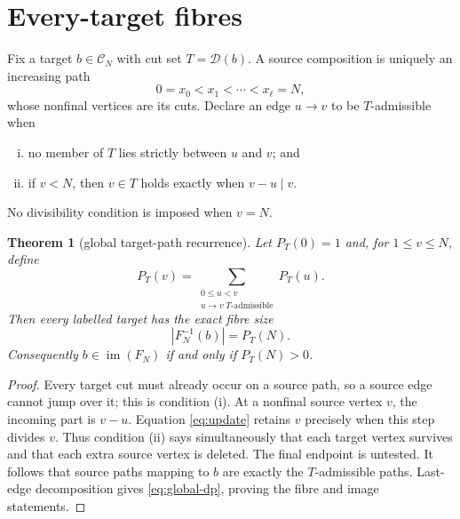 \documentclass[a4paper,10pt]{amsart}
\newtheorem{theorem}{Theorem}[section]
\theoremstyle{remark}
\newcommand{\Comp}{\mathcal C}
\newcommand{\Cuts}{\mathcal D}
\newcommand{\im}{\operatorname{im}}
\begin{document}
\section{Every-target fibres}

Fix a target $b\in\Comp_N$ with cut set $T=\Cuts(b)$.  A source composition
is uniquely an increasing path
\begin{equation}\label{eq:path}
 0=x_0<x_1<\cdots<x_\ell=N,
\end{equation}
whose nonfinal vertices are its cuts.  Declare an edge $u\to v$ to be
$T$-admissible when
\begin{enumerate}[(i)]
\item no member of $T$ lies strictly between $u$ and $v$; and
\item if $v<N$, then $v\in T$ holds exactly when $v-u\mid v$.
\end{enumerate}
No divisibility condition is imposed when $v=N$.

\begin{theorem}[global target-path recurrence]\label{thm:global-fibre}
Let $P_T(0)=1$ and, for $1\leq v\leq N$, define
\begin{equation}\label{eq:global-dp}
 P_T(v)=\sum_{\substack{0\leq u<v\\u\to v\;T\text{-admissible}}}P_T(u).
\end{equation}
Then every labelled target has the exact fibre size
\begin{equation}\label{eq:fibre-global}
 |F_N^{-1}(b)|=P_T(N).
\end{equation}
Consequently $b\in\im(F_N)$ if and only if $P_T(N)>0$.
\end{theorem}

\begin{proof}
Every target cut must already occur on a source path, so a source edge cannot
jump over it; this is condition (i).  At a nonfinal source vertex $v$, the
incoming part is $v-u$.  Equation \eqref{eq:update} retains $v$ precisely
when this step divides $v$.  Thus condition (ii) says simultaneously that
each target vertex survives and that each extra source vertex is deleted.
The final endpoint is untested.  It follows that source paths mapping to $b$
are exactly the $T$-admissible paths.  Last-edge decomposition gives
\eqref{eq:global-dp}, proving the fibre and image statements.
\end{proof}
\end{document}
